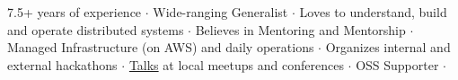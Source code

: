 

\begin{cvparagraph}
7.5+ years of experience ${\cdotp}$ Wide-ranging Generalist ${\cdotp}$ Loves to understand, build and operate distributed systems ${\cdotp}$ Believes in Mentoring and Mentorship ${\cdotp}$ Managed Infrastructure (on AWS) and daily operations ${\cdotp}$ Organizes internal and external hackathons ${\cdotp}$ \href{https://github.com/ashwanthkumar/talks}{Talks} at local meetups and conferences ${\cdotp}$ OSS Supporter ${\cdotp}$
\end{cvparagraph}
